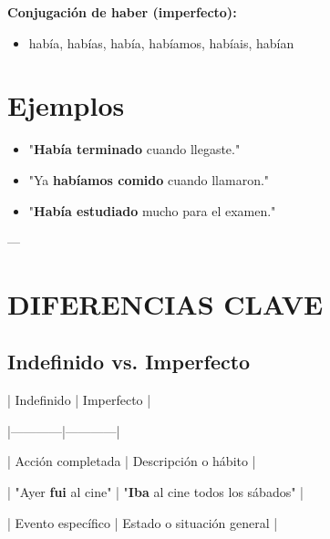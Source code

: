\documentclass[a4paper,11pt]{article}
\begin{document}
\textbf{Conjugación de haber (imperfecto):}

\begin{itemize}

  \item había, habías, había, habíamos, habíais, habían

\end{itemize}

\vspace{0.2cm}

\section{Ejemplos}

\begin{itemize}

  \item "\textbf{Había terminado} cuando llegaste."

  \item "Ya \textbf{habíamos comido} cuando llamaron."

  \item "\textbf{Había estudiado} mucho para el examen."

\end{itemize}

\vspace{0.2cm}

---

\vspace{0.2cm}

\section{DIFERENCIAS CLAVE}

\vspace{0.2cm}

\subsection{Indefinido vs. Imperfecto}

\vspace{0.2cm}

| Indefinido | Imperfecto |

|------------|------------|

| Acción completada | Descripción o hábito |

| "Ayer \textbf{fui} al cine" | "\textbf{Iba} al cine todos los sábados" |

| Evento específico | Estado o situación general |
\end{document}
